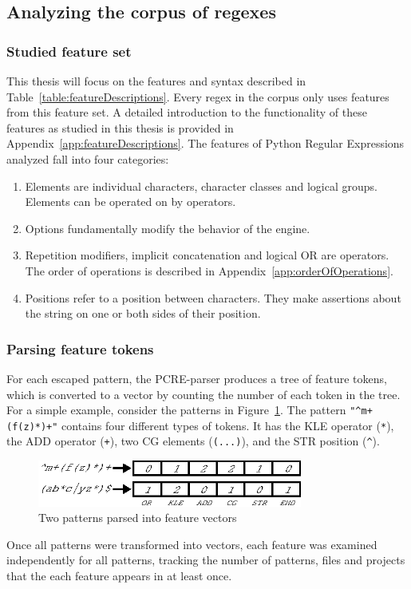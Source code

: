 \subsection{Analyzing the corpus of regexes}
\label{sec:corpusAnalyzing}

\subsubsection{Studied feature set}



This thesis will focus on the features and syntax described in Table~\ref{table:featureDescriptions}.  Every regex in the corpus only uses features from this feature set.  A detailed introduction to the functionality of these features as studied in this thesis is provided in Appendix~\ref{app:featureDescriptions}.  The features of Python Regular Expressions analyzed fall into four categories:

\begin{enumerate} \itemsep -1pt
\item{Elements are individual characters, character classes and logical groups.  Elements can be operated on by operators.}
\item{Options fundamentally modify the behavior of the engine.}
\item{Repetition modifiers, implicit concatenation and logical OR are operators. The order of operations is described in Appendix~\ref{app:orderOfOperations}}.
\item{Positions refer to a position between characters.  They make assertions about the string on one or both sides of their position.}
\end{enumerate}

\subsubsection{Parsing feature tokens}
For each escaped pattern, the PCRE-parser produces a tree of feature tokens, which is converted to a vector by counting the number of each token in the tree.  For a simple example, consider the patterns in Figure~\ref{fig:featureParsing}.  The pattern \verb!"^m+(f(z)*)+"! contains four different types of tokens. It has the KLE operator (\verb!*!), the ADD operator (\verb!+!), two CG elements (\verb!(...)!), and the STR position (\verb!^!).

\begin{figure}[hb]
\centering
\includegraphics[height=0.6in]{nontex/illustrations/featureParsing.eps}
\caption{Two patterns parsed into feature vectors}
\label{fig:featureParsing}
\vspace{-12pt}
\end{figure}

Once all patterns were transformed into vectors, each feature was examined independently for all patterns, tracking the number of patterns, files and projects that the each feature appears in at least once.
